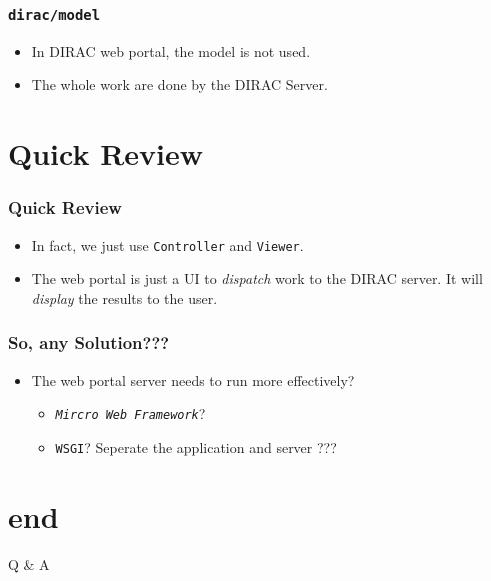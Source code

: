 \documentclass[20pt]{beamer}
\begin{document}
\begin{frame}
    \frametitle{{\tt dirac/model}}
    \begin{itemize}    
        \item In DIRAC web portal, the model is not used.
        \item The whole work are done by the DIRAC Server.
    \end{itemize}
\end{frame}

\section{Quick Review}

\begin{frame}
    \frametitle{Quick Review}
    \begin{itemize}    
        \item In fact, we just use {\tt Controller}
            and {\tt Viewer}.
        \item The web portal is just a UI
            to \emph{dispatch} work to the DIRAC server.
            It will \emph{display} the results to the user.
    \end{itemize}
\end{frame}

\begin{frame}
    \frametitle{So, any Solution???}
    \begin{itemize}    
        \item The web portal server needs to run more effectively?
        \begin{itemize}    
            \item \emph{{\tt Mircro Web Framework}}?
            \item {\tt WSGI}? Seperate the application and server ???
        \end{itemize}
    \end{itemize}
\end{frame}

\section*{end}
\begin{frame}

    \begin{center}
        \LARGE Q \& A
    \end{center}
\end{frame}
\end{document}
